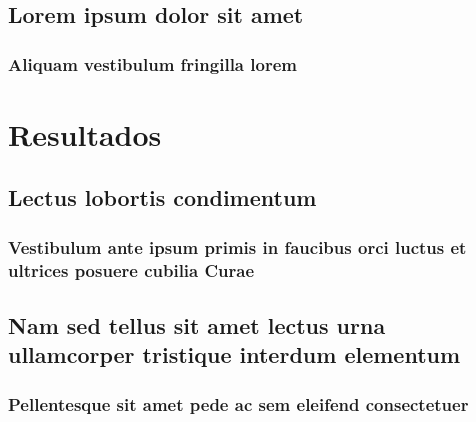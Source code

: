 \documentclass[
    12pt,				%
    openright,			%
    twoside,			%
    a4paper,			%
    english,			%
    french,				%
    spanish,			%
    brazil				%
    ]{abntex2}
\begin{document}
\chapter{Lorem ipsum dolor sit amet}

\section{Aliquam vestibulum fringilla lorem}

\lipsum[1]

\lipsum[2-3]

\part{Resultados}

\chapter{Lectus lobortis condimentum}

\section{Vestibulum ante ipsum primis in faucibus orci luctus et ultrices
posuere cubilia Curae}

\lipsum[21-22]

\chapter{Nam sed tellus sit amet lectus urna ullamcorper tristique interdum
elementum}

\section{Pellentesque sit amet pede ac sem eleifend consectetuer}

\lipsum[24]

\end{document}
